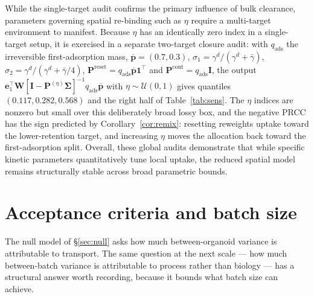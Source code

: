 \documentclass[pdflatex,sn-mathphys-num]{sn-jnl}
\numberwithin{equation}{section}
\theoremstyle{thmstyleone}%
\theoremstyle{definition}
\theoremstyle{remark}
\begin{document}
While the single-target audit confirms the primary influence of bulk clearance, parameters governing spatial re-binding such as $\eta$ require a multi-target environment to manifest. Because $\eta$ has an identically zero index in a single-target setup, it is exercised in a separate two-target closure audit: 
with $q_{\mathrm{ads}}$ the irreversible first-adsorption mass, $\overline{\bm p}=(0.7,0.3)$,
$\sigma_1=\gamma^d/(\gamma^d+\bar\gamma)$,
$\sigma_2=\gamma^d/(\gamma^d+\bar\gamma/4)$,
$\mathbf P^{\mathrm{reset}}=q_{\mathrm{ads}}\overline{\bm p}\mathbf1^\top$ and
$\mathbf P^{\mathrm{cont}}=q_{\mathrm{ads}}\mathbf I$, the output
$\mathbf e_1^\top\bm W[\mathbf I-\mathbf P^{(\eta)}\bm\Sigma]^{-1}
q_{\mathrm{ads}}\overline{\bm p}$ with $\eta\sim\mathcal U(0,1)$ gives quantiles
$(0.117,0.282,0.568)$ and the right half of Table~\ref{tab:sens}. The $\eta$
indices are nonzero but small over this deliberately broad lossy box, and the
negative PRCC has the sign predicted by Corollary~\ref{cor:remix}: resetting
reweights uptake toward the lower-retention target, and increasing $\eta$ moves
the allocation back toward the first-adsorption split. Overall, these global audits demonstrate that while specific kinetic parameters quantitatively tune local uptake, the reduced spatial model remains structurally stable across broad parametric bounds.

\section{Acceptance criteria and batch size}
\label{sec:acceptance}
The null model of \S\ref{sec:null} asks how much between-organoid variance is attributable to transport. The same question at the next scale ---
how much between-batch variance is attributable to process rather than
biology --- has a structural answer worth recording, because it bounds what
batch size can achieve.
\end{document}
